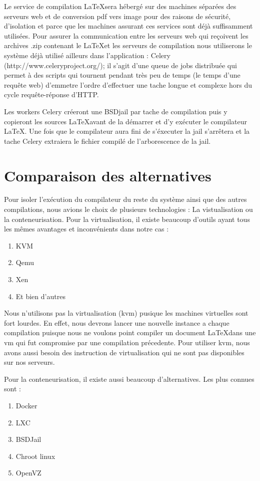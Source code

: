 \documentclass[10pt,a4paper]{article}
\begin{document}
Le service de compilation \LaTeX sera hébergé sur des machines séparées des serveurs web et de conversion pdf vers image pour des raisons de sécurité, d'isolation et parce que les machines assurant ces services sont déjà suffisamment utilisées.
Pour assurer la communication entre les serveurs web qui reçoivent les archives .zip contenant le \LaTeX et les serveurs de compilation nous utiliserons le système déjà utilisé ailleurs dans l'application :
Celery (http://www.celeryproject.org/); il s'agit d'une queue de jobs distribuée qui permet à des scripts qui tournent pendant très peu de temps (le temps d'une requête web) d'emmetre l'ordre d'effectuer une tache longue et complexe hors du cycle requête-réponse d'HTTP.

Les workers Celery créeront une BSDjail par tache de compilation puis y copieront les sources \LaTeX avant de la démarrer et d'y exécuter le compilateur \LaTeX.
Une fois que le compilateur aura fini de s'éxecuter la jail s'arrêtera et la tache Celery extraiera le fichier compilé de l'arborescence de la jail.


\section{Comparaison des alternatives}
Pour isoler l'exécution du compilateur du reste du système ainsi que des autres compilations,
nous avions le choix de plusieurs technologies : La vistualisation ou la conteneurisation.
Pour la virtualisation, il existe beaucoup d'outils ayant tous les mêmes avantages et inconvénients dans notre cas :
\begin{enumerate}
    \item{KVM}
    \item{Qemu}
    \item{Xen}
    \item{Et bien d'autres}
\end{enumerate}

Nous n'utilisons pas la virtualisation (kvm) pusique les machines virtuelles sont fort lourdes.
En effet, nous devrons lancer une nouvelle instance a chaque compilation puisque nous ne voulons point compiler un document \LaTeX dans une vm qui fut compromise par une compilation précedente.
Pour utiliser kvm, nous avons aussi besoin des instruction de virtualisation qui ne sont pas disponibles sur nos serveurs.


Pour la conteneurisation, il existe aussi beaucoup d'alternatives. Les plus connues sont :
\begin{enumerate}
    \item{Docker}
    \item{LXC}
    \item{BSDJail}
    \item{Chroot linux}
    \item{OpenVZ}
\end{enumerate}
\end{document}
